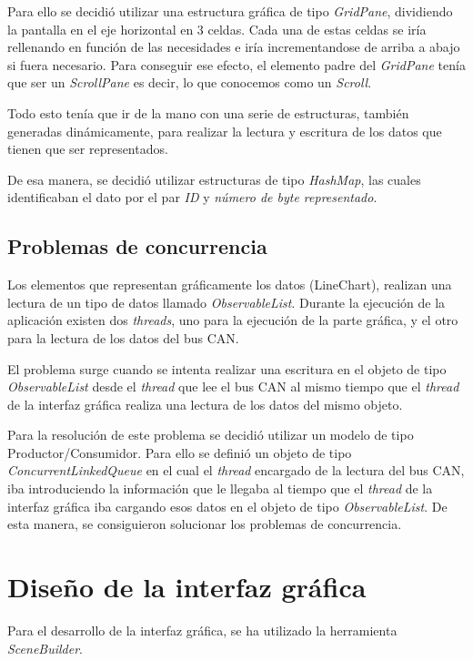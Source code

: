 Para ello se decidió utilizar una estructura gráfica de tipo \emph{GridPane}, dividiendo la pantalla en el eje horizontal en 3 celdas. Cada una de estas celdas se iría rellenando en función de las necesidades e iría incrementandose de arriba a abajo si fuera necesario. Para conseguir ese efecto, el elemento padre del \emph{GridPane} tenía que ser un \emph{ScrollPane} es decir, lo que conocemos como un \emph{Scroll}.

Todo esto tenía que ir de la mano con una serie de estructuras, también generadas dinámicamente, para realizar la lectura y escritura de los datos que tienen que ser representados.

De esa manera, se decidió utilizar estructuras de tipo \emph{HashMap}, las cuales identificaban el dato por el par \emph{ID} y \emph{número de byte representado}.

\subsection{Problemas de concurrencia}\label{problemas_de_concurrencia}

Los elementos que representan gráficamente los datos (LineChart), realizan una lectura de un tipo de datos llamado \emph{ObservableList}. Durante la ejecución de la aplicación existen dos \emph{threads}, uno para la ejecución de la parte gráfica, y el otro para la lectura de los datos del bus CAN.

El problema surge cuando se intenta realizar una escritura en el objeto de tipo \emph{ObservableList} desde el \emph{thread} que lee el bus CAN al mismo tiempo que el \emph{thread} de la interfaz gráfica realiza una lectura de los datos del mismo objeto.

Para la resolución de este problema se decidió utilizar un modelo de tipo Productor/Consumidor. Para ello se definió un objeto de tipo \emph{ConcurrentLinkedQueue} en el cual el \emph{thread} encargado de la lectura del bus CAN, iba introduciendo la información que le llegaba al tiempo que el \emph{thread} de la interfaz gráfica iba cargando esos datos en el objeto de tipo \emph{ObservableList}. De esta manera, se consiguieron solucionar los problemas de concurrencia.

\section{Diseño de la interfaz gráfica}\label{diseño_de_la_interfaz_grafica}

Para el desarrollo de la interfaz gráfica, se ha utilizado la herramienta \emph{SceneBuilder}.

